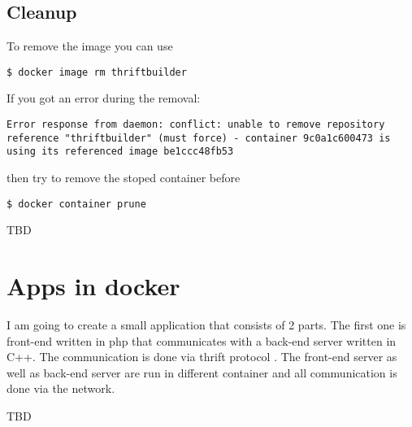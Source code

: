 \documentclass[14pt,a4paper]{article}
\begin{document}
\subsection{Cleanup}
To remove the image you can use
\begin{verbatim}
$ docker image rm thriftbuilder
\end{verbatim}
If you got an error during the removal:
\begin{verbatim}
Error response from daemon: conflict: unable to remove repository
reference "thriftbuilder" (must force) - container 9c0a1c600473 is
using its referenced image be1ccc48fb53
\end{verbatim}
then try to remove the stoped container before
\begin{verbatim}
$ docker container prune
\end{verbatim}
TBD

\section{Apps in docker}
I am going to create a small application that consists of 2 parts. The
first one is front-end written in php that communicates with a back-end server
written in C++. The communication is done via thrift protocol
\cite{apache:thrift}. The front-end server as well as back-end server
are run in different container and all communication is done via the
network. 

TBD

  
     
\end{document}

